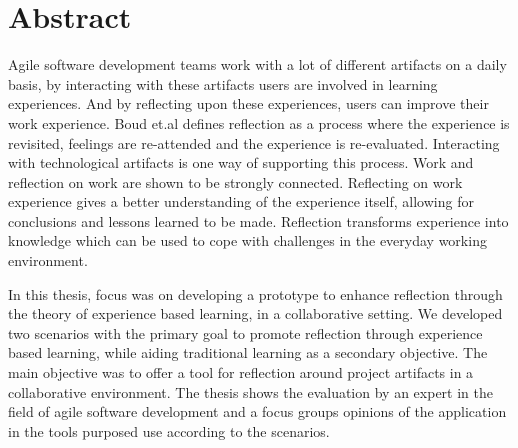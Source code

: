 \chapter*{Abstract}
Agile software development teams work with a lot of different artifacts on a daily basis, by interacting with these artifacts users are involved in learning experiences. And by reflecting upon these experiences, users can improve their work experience. Boud et.al defines reflection as a process where the experience is revisited, feelings are re-attended and the experience is re-evaluated\citep{boudreflection1985}. Interacting with technological artifacts is one way of supporting this process. 
Work and reflection on work are shown to be strongly connected\citep{Schon1983}\citep{Chaiklin1993}. Reflecting on work experience gives a better understanding of the experience itself, allowing for conclusions and lessons learned to be made. 
Reflection transforms experience into knowledge which can be used to cope with challenges in the everyday working environment. 

In this thesis, focus was on developing a prototype to enhance reflection through the theory of experience based learning, in a collaborative setting. We developed two scenarios with the primary goal to promote reflection through experience based learning, while aiding traditional learning as a secondary objective. The main objective was to offer a tool for reflection around project artifacts in a collaborative environment. The thesis shows the evaluation by an expert in the field of agile software development and a focus groups opinions of the application in the tools purposed use according to the scenarios.


